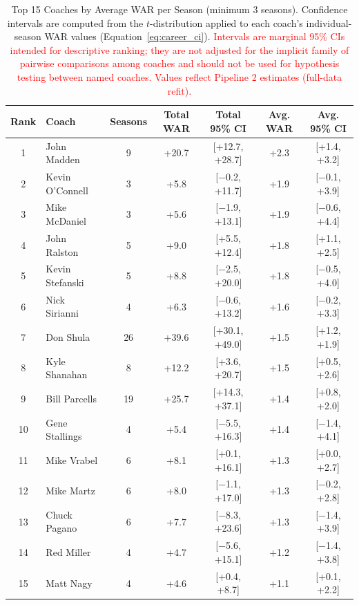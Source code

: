 \documentclass[USenglish]{article}
\newcommand{\rev}[1]{\textcolor{red}{#1}}
\theoremstyle{dgthm}
\theoremstyle{dgdef}
\begin{document}
\begin{table}[!ht]
\caption{Top 15 Coaches by Average WAR per Season (minimum 3 seasons). Confidence intervals are computed from the $t$-distribution applied to each coach's individual-season WAR values (Equation~\ref{eq:career_ci}). \rev{Intervals are marginal 95\% CIs intended for descriptive ranking; they are not adjusted for the implicit family of pairwise comparisons among coaches and should not be used for hypothesis testing between named coaches. Values reflect Pipeline 2 estimates (full-data refit).}}
\label{tab:top_coaches}
\small
\begin{tabular}{clccccc}
\toprule
Rank & Coach & Seasons & Total WAR & Total 95\% CI & Avg. WAR & Avg. 95\% CI \\
\midrule
1 & John Madden & 9 & +20.7 & [+12.7, +28.7] & +2.3 & [+1.4, +3.2] \\
2 & Kevin O'Connell & 3 & +5.8 & [$-$0.2, +11.7] & +1.9 & [$-$0.1, +3.9] \\
3 & Mike McDaniel & 3 & +5.6 & [$-$1.9, +13.1] & +1.9 & [$-$0.6, +4.4] \\
4 & John Ralston & 5 & +9.0 & [+5.5, +12.4] & +1.8 & [+1.1, +2.5] \\
5 & Kevin Stefanski & 5 & +8.8 & [$-$2.5, +20.0] & +1.8 & [$-$0.5, +4.0] \\
6 & Nick Sirianni & 4 & +6.3 & [$-$0.6, +13.2] & +1.6 & [$-$0.2, +3.3] \\
7 & Don Shula & 26 & +39.6 & [+30.1, +49.0] & +1.5 & [+1.2, +1.9] \\
8 & Kyle Shanahan & 8 & +12.2 & [+3.6, +20.7] & +1.5 & [+0.5, +2.6] \\
9 & Bill Parcells & 19 & +25.7 & [+14.3, +37.1] & +1.4 & [+0.8, +2.0] \\
10 & Gene Stallings & 4 & +5.4 & [$-$5.5, +16.3] & +1.4 & [$-$1.4, +4.1] \\
11 & Mike Vrabel & 6 & +8.1 & [+0.1, +16.1] & +1.3 & [+0.0, +2.7] \\
12 & Mike Martz & 6 & +8.0 & [$-$1.1, +17.0] & +1.3 & [$-$0.2, +2.8] \\
13 & Chuck Pagano & 6 & +7.7 & [$-$8.3, +23.6] & +1.3 & [$-$1.4, +3.9] \\
14 & Red Miller & 4 & +4.7 & [$-$5.6, +15.1] & +1.2 & [$-$1.4, +3.8] \\
15 & Matt Nagy & 4 & +4.6 & [+0.4, +8.7] & +1.1 & [+0.1, +2.2] \\
\bottomrule
\end{tabular}
\end{table}
\end{document}
